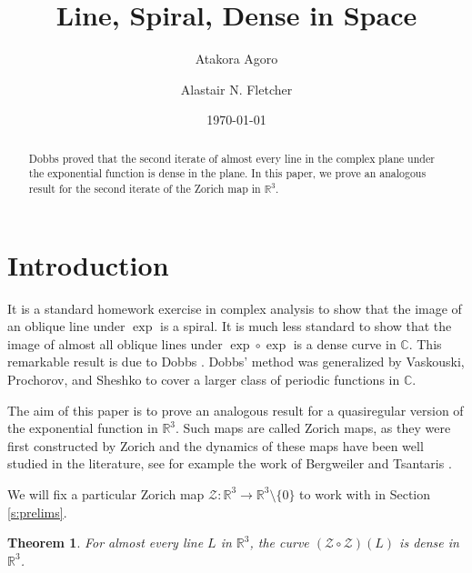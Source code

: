 \documentclass[11pt]{amsart}
\newtheorem{theorem}{Theorem}[section]
\numberwithin{equation}{section}
\theoremstyle{definition}
\theoremstyle{definition}
\theoremstyle{definition}
\newcommand{\R}{\mathbb{R}}
\newcommand{\C}{\mathbb{C}}
\begin{document}
\date{\today}
\title{Line, Spiral, Dense in Space}

\author{Atakora Agoro}
\address{Department of Mathematical Sciences, Northern Illinois University, DeKalb, IL 60115-2888, USA}

\author{Alastair N. Fletcher}
\address{Department of Mathematical Sciences, Northern Illinois University, DeKalb, IL 60115-2888, USA}

\begin{abstract}
Dobbs proved that the second iterate of almost every line in the complex plane under the exponential function is dense in the plane. In this paper, we prove an analogous result for the second iterate of the Zorich map in $\R^3$.
\end{abstract}

\maketitle

\section{Introduction}
\label{s:intro}

It is a standard homework exercise in complex analysis to show that the image of an oblique line under $\exp$ is a spiral. It is much less standard to show that the image of almost all oblique lines under $\exp \circ \exp$ is a dense curve in $\C$. This remarkable result is due to Dobbs \cite[Theorem 1]{Dob15}. Dobbs' method was generalized by Vaskouski, Prochorov, and Sheshko \cite{VPS19} to cover a larger class of periodic functions in $\C$.

The aim of this paper is to prove an analogous result for a quasiregular version of the exponential function in $\R^3$. Such maps are called Zorich maps, as they were first constructed by Zorich \cite{Zor67} and the dynamics of these maps have been well studied in the literature, see for example the work of Bergweiler \cite{Ber10} and Tsantaris \cite{Tsa23}.

We will fix a particular Zorich map $\mathcal{Z}:\R^3 \to \R^3 \setminus \{ 0 \}$ to work with in Section \ref{s:prelims}.

\begin{theorem}
    \label{thm:1}
For almost every line $L$ in $\R^3$, the curve $(\mathcal{Z} \circ \mathcal{Z}) (L)$ is dense in $\R^3$.
\end{theorem}
\end{document}
